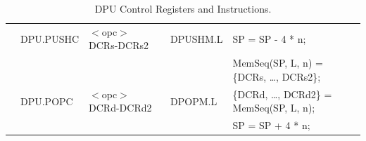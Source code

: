 \begin{table}
\begin{subtable}{\linewidth}
\begin{center}
\begin{tabular}{lllll}
                   & DPU.PUSHC         & $<$opc$>$ DCRs-DCRs2                  & DPUSHM.L          & SP = SP - 4 * n;                                                              \\
                   &                   &                                       &                   & MemSeq(SP, L, n) = \{DCRs, \ldots, DCRs2\};                                   \\
                   & DPU.POPC          & $<$opc$>$ DCRd-DCRd2                  & DPOPM.L           & \{DCRd, \ldots, DCRd2\} = MemSeq(SP, L, n);                                   \\
                   &                   &                                       &                   & SP = SP + 4 * n;                                                              \\ \hline
\end{tabular}
\end{center}
\captionsetup{font=scriptsize, labelfont=scriptsize}
\caption{Double Precision Floating Point Unit (DPU) Instructions. DPU instructions are available only in v3.
DPU Instructions don't update PSW flags (\flags{----}), except MVFDR, which updates Z (\flags{--!-})}
\end{subtable}

\captionsetup{font=scriptsize, labelfont=scriptsize}
\caption{DPU Control Registers and Instructions.}
\end{table}


%
%

